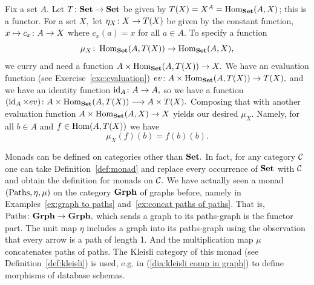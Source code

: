 \documentclass[../main/CT4S-EN-RU]{subfiles}
\begin{document}
\begin{exerciseRUS}\label{exc:exceptions}
\end{exerciseRUS}

\begin{exampleENG}\label{ex:experimenter matters 2}
Fix a set $A.$ Let $T\colon{\mathbf{Set}}\rightarrow{\mathbf{Set}}$ be given by $T(X)=X^A=\operatorname{Hom}_{\mathbf{Set}}(A,X)$; this is a functor. For a set $X,$ let $\eta_X\colon X\rightarrow T(X)$ be given by the constant function, $x\mapsto c_x\colon A\rightarrow X$ where $c_x(a)=x$ for all $a\in A.$ To specify a function
$$\mu_X\colon\operatorname{Hom}_{\mathbf{Set}}(A,T(X))\rightarrow\operatorname{Hom}_{\mathbf{Set}}(A,X),$$ we curry and need a function $A\times\operatorname{Hom}_{\mathbf{Set}}(A,T(X))\rightarrow X.$ We have an evaluation function (see Exercise~\ref{exc:evaluation}) $ev\colon A\times\operatorname{Hom}_{\mathbf{Set}}(A,T(X))\rightarrow T(X),$ and we have an identity function $\operatorname{id}_A\colon A\rightarrow A,$ so we have a function $(\operatorname{id}_A\times ev)\colon A\times\operatorname{Hom}_{\mathbf{Set}}(A,T(X))\longrightarrow A\times T(X).$ Composing that with another evaluation function $A\times\operatorname{Hom}_{\mathbf{Set}}(A,X)\rightarrow X$ yields our desired $\mu_X.$ Namely, for all $b\in A$ and $f\in\operatorname{Hom}(A,T(X))$ we have
$$\mu_X(f)(b)=f(b)(b).$$
\end{exampleENG}

\begin{exampleRUS}\label{ex:experimenter matters 2}
\end{exampleRUS}

\begin{remarkENG}
Monads can be defined on categories other than ${\mathbf{Set}}.$ In fact, for any category $\mathcal{C}$ one can take Definition~\ref{def:monad} and replace every occurrence of ${\mathbf{Set}}$ with $\mathcal{C}$ and obtain the definition for monads on $\mathcal{C}.$ We have actually seen a monad $(\operatorname{Paths},\eta,\mu)$ on the category ${\mathbf{Grph}}$ of graphs before, namely in Examples~\ref{ex:graph to paths} and~\ref{ex:concat paths of paths}. That is, $\operatorname{Paths}\colon{\mathbf{Grph}}\rightarrow{\mathbf{Grph}},$ which sends a graph to its paths-graph is the functor part. The unit map $\eta$ includes a graph into its paths-graph using the observation that every arrow is a path of length 1. And the multiplication map $\mu$ concatenates paths of paths. The Kleisli category of this monad (see Definition~\ref{def:kleisli}) is used, e.g. in (\ref{dia:kleisli comp in graph}) to define morphisms of database schemas.
\end{remarkENG}

\begin{remarkRUS}
\end{remarkRUS}
\end{document}
